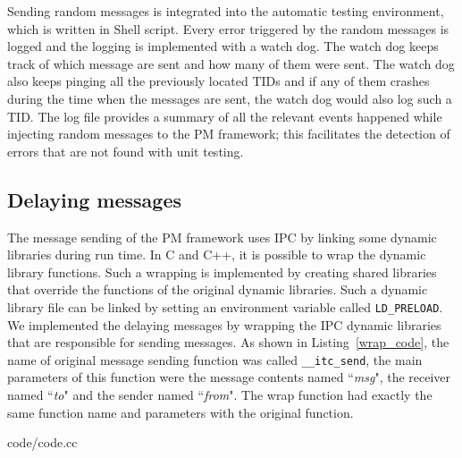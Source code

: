 %

Sending random messages is integrated into the automatic testing environment, which is written in Shell script. Every error triggered by the random messages is logged and the logging is implemented with a watch dog. The watch dog keeps track of which message are sent and how many of them were sent. The watch dog also keeps pinging all the previously located TIDs and if any of them crashes during the time when the messages are sent, the watch dog would also log such a TID. The log file provides a summary of all the relevant events happened while injecting random messages to the PM framework; this facilitates the detection of errors that are not found with unit testing.

\subsection{Delaying messages}\label{sec:delayingMessages}
The message sending of the PM framework uses IPC by linking some dynamic libraries during run time. In C and C++, it is possible to wrap the dynamic library functions. Such a wrapping is implemented by creating shared libraries that override the functions of the original dynamic libraries. Such a dynamic library file can be linked by setting an environment variable called \texttt{LD\_PRELOAD}. We implemented the delaying messages by wrapping the IPC dynamic libraries that are responsible for sending messages. As shown in Listing~\ref{wrap_code}, the name of original message sending function was called  \texttt{\_\_itc\_send}, the main parameters of this function were the message contents named ``{\em msg}", the receiver named ``{\em to}" and the sender named ``{\em from}". The wrap function had exactly the same function name and parameters with the original function. 

\begin{minipage}{.96\columnwidth}

{code/code.cc}
\end{minipage}


